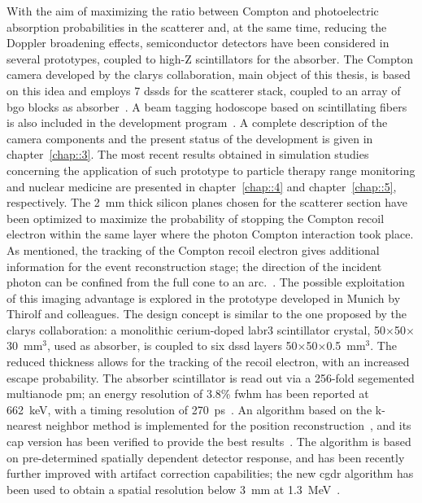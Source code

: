 With the aim of maximizing the ratio between Compton and photoelectric absorption probabilities in the scatterer and, at the same time, reducing the Doppler broadening effects, semiconductor detectors have been considered in several prototypes, coupled to high-Z scintillators for the absorber. The Compton camera developed by the \gls{clarys} collaboration, main object of this thesis, is based on this idea and employs 7 \glspl{dssd} for the scatterer stack, coupled to an array of \gls{bgo} blocks as absorber~\parencite{Krimmer2015, Fontana2018}. A beam tagging hodoscope based on scintillating fibers is also included in the development program~\parencite{Krimmer2014}. A complete description of the camera components and the present status of the development is given in chapter~\ref{chap::3}. The most recent results obtained in simulation studies concerning the application of such prototype to particle therapy range monitoring and nuclear medicine are presented in chapter~\ref{chap::4} and chapter~\ref{chap::5}, respectively. 
The 2~mm thick silicon planes chosen for the scatterer section have been optimized to maximize the probability of stopping the Compton recoil electron within the same layer where the photon Compton interaction took place. As mentioned, the tracking of the Compton recoil electron gives additional information for the event reconstruction stage; the direction of the incident photon can be confined from the full cone to an arc.~\parencite{Frandes2010}. The possible exploitation of this imaging advantage is explored in the prototype developed in Munich by Thirolf and colleagues. The design concept is similar to the one proposed by the \gls{clarys} collaboration: a monolithic cerium-doped  \gls{labr3} scintillator crystal, 50$\times$50$\times$30~mm$^3$, used as absorber, is coupled to six \gls{dssd} layers 50$\times$50$\times$0.5~mm$^3$. The reduced thickness allows for the tracking of the recoil electron, with an increased escape probability. The absorber scintillator is read out via a 256-fold segemented multianode \gls{pm}; an energy resolution of 3.8\%  \gls{fwhm} has been reported at 662~keV, with a timing resolution of 270~ps~\parencite{Thirolf2016}.  An algorithm based on the k-nearest neighbor method is implemented for the position reconstruction~\parencite{vanDam2011}, and its \gls{cap} version has been verified to provide the best results~\parencite{Aldawood2017}. The algorithm is based on pre-determined spatially dependent detector response, and has been recently further improved with artifact correction capabilities; the new \gls{cgdr} algorithm has been used to obtain a spatial resolution below 3~mm at 1.3~MeV~\parencite{Liprandi2017}. 
